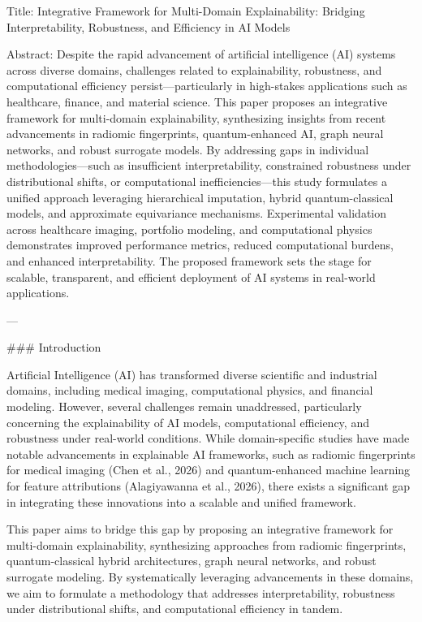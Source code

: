 Title: Integrative Framework for Multi-Domain Explainability: Bridging Interpretability, Robustness, and Efficiency in AI Models  

Abstract:  
Despite the rapid advancement of artificial intelligence (AI) systems across diverse domains, challenges related to explainability, robustness, and computational efficiency persist—particularly in high-stakes applications such as healthcare, finance, and material science. This paper proposes an integrative framework for multi-domain explainability, synthesizing insights from recent advancements in radiomic fingerprints, quantum-enhanced AI, graph neural networks, and robust surrogate models. By addressing gaps in individual methodologies—such as insufficient interpretability, constrained robustness under distributional shifts, or computational inefficiencies—this study formulates a unified approach leveraging hierarchical imputation, hybrid quantum-classical models, and approximate equivariance mechanisms. Experimental validation across healthcare imaging, portfolio modeling, and computational physics demonstrates improved performance metrics, reduced computational burdens, and enhanced interpretability. The proposed framework sets the stage for scalable, transparent, and efficient deployment of AI systems in real-world applications.

---

### Introduction  

Artificial Intelligence (AI) has transformed diverse scientific and industrial domains, including medical imaging, computational physics, and financial modeling. However, several challenges remain unaddressed, particularly concerning the explainability of AI models, computational efficiency, and robustness under real-world conditions. While domain-specific studies have made notable advancements in explainable AI frameworks, such as radiomic fingerprints for medical imaging (Chen et al., 2026) and quantum-enhanced machine learning for feature attributions (Alagiyawanna et al., 2026), there exists a significant gap in integrating these innovations into a scalable and unified framework.  

This paper aims to bridge this gap by proposing an integrative framework for multi-domain explainability, synthesizing approaches from radiomic fingerprints, quantum-classical hybrid architectures, graph neural networks, and robust surrogate modeling. By systematically leveraging advancements in these domains, we aim to formulate a methodology that addresses interpretability, robustness under distributional shifts, and computational efficiency in tandem.  

